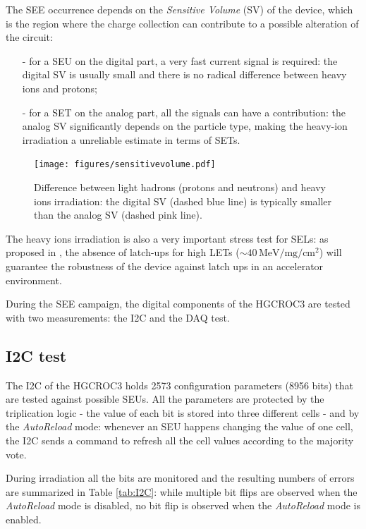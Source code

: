 The SEE occurrence depends on the \textit{Sensitive Volume} (SV) of the device, which is the region where the charge collection can contribute to a possible alteration of the circuit:
\begin{itemize}
    \item [-] for a SEU on the digital part, a very fast current signal is required: the digital SV is usually small and there is no radical difference between heavy ions and protons;
    \item [-] for a SET on the analog part, all the signals can have a contribution: the analog SV significantly depends on the particle type, making the heavy-ion irradiation a unreliable estimate in terms of SETs.
\end{itemize}

\begin{figure}[b]
    \centering
    \texttt{[image: figures/sensitivevolume.pdf]}
    \caption{Difference between light hadrons (protons and neutrons) and heavy ions irradiation: the digital SV (dashed blue line) is typically smaller than the analog SV (dashed pink line).}
    \label{fig:sensitivevolume}
\end{figure}

The heavy ions irradiation is also a very important stress test for SELs: as proposed in \cite{federico}, the absence of latch-ups for high LETs ($\sim$$40\,\textrm{MeV}/\textrm{mg}/\textrm{cm}^2$) will guarantee the robustness of the device against latch ups in an accelerator environment.

During the SEE campaign, the digital components of the HGCROC3 are tested with two measurements: the I2C and the DAQ test.

\vspace{-2.8mm}
\subsection*{I2C test}
 The I2C of the HGCROC3 holds 2573 configuration parameters (8956 bits) that are tested against possible SEUs. All the parameters are protected by the triplication logic - the value of each bit is stored into three different cells - and by the \textit{AutoReload} mode: whenever an SEU happens changing the value of one cell, the I2C sends a command to refresh all the cell values according to the majority vote.
 
 During irradiation all the bits are monitored and the resulting numbers of errors are summarized in Table \ref{tab:I2C}: while multiple bit flips are observed when the \textit{AutoReload} mode is disabled, no bit flip is observed when the \textit{AutoReload} mode is enabled.

